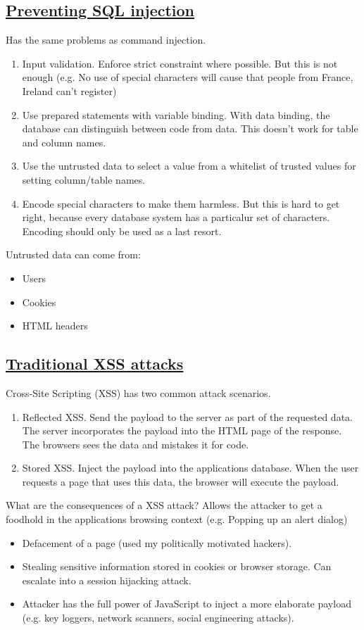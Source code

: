 \documentclass[titlepage]{article}
\begin{document}
    \subsection{\href{https://youtu.be/zYZu1yHENmw}{Preventing SQL injection}}
    Has the same problems as command injection.
    \begin{enumerate}
        \item Input validation. Enforce strict constraint where possible. But this is not enough (e.g. No use of special characters will cause that people from France, Ireland can't register)
        \item Use prepared statements with variable binding. With data binding, the database can distinguish between code from data. This doesn't work for table and column names.
        \item Use the untrusted data to select a value from a whitelist of trusted values for setting column/table names. 
        \item Encode special characters to make them harmless. But this is hard to get right, because every database system has a particalur set of characters. Encoding should only be used as a last resort.
    \end{enumerate}
    Untrusted data can come from:
    \begin{itemize}
        \item Users
        \item Cookies
        \item HTML headers
    \end{itemize}
    \subsection{\href{https://youtu.be/5P_5ilLvXhQ}{Traditional XSS attacks}}
    Cross-Site Scripting (XSS) has two common attack scenarios.
    \begin{enumerate}
        \item Reflected XSS. Send the payload to the server as part of the requested data. The server incorporates the payload into the HTML page of the response. The browsers sees the data and mistakes it for code.
        \item Stored XSS. Inject the payload into the applications database. When the user requests a page that uses this data, the browser will execute the payload.
    \end{enumerate}
    What are the consequences of a XSS attack? Allows the attacker to get a foodhold in the applications browsing context (e.g. Popping up an alert dialog)
    \begin{itemize}
        \item Defacement of a page (used my politically motivated hackers).
        \item Stealing sensitive information stored in cookies or browser storage. Can escalate into a session hijacking attack.
        \item Attacker has the full power of JavaScript to inject a more elaborate payload (e.g. key loggers, network scanners, social engineering attacks).
    \end{itemize}
\end{document}

